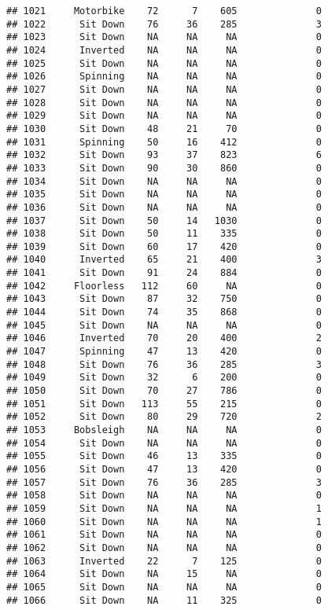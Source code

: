 \documentclass[
]{article}
\begin{document}
\begin{verbatim}
## 1021     Motorbike    72      7    605              0
## 1022      Sit Down    76     36    285              3
## 1023      Sit Down    NA     NA     NA              0
## 1024      Inverted    NA     NA     NA              0
## 1025      Sit Down    NA     NA     NA              0
## 1026      Spinning    NA     NA     NA              0
## 1027      Sit Down    NA     NA     NA              0
## 1028      Sit Down    NA     NA     NA              0
## 1029      Sit Down    NA     NA     NA              0
## 1030      Sit Down    48     21     70              0
## 1031      Spinning    50     16    412              0
## 1032      Sit Down    93     37    823              6
## 1033      Sit Down    90     30    860              0
## 1034      Sit Down    NA     NA     NA              0
## 1035      Sit Down    NA     NA     NA              0
## 1036      Sit Down    NA     NA     NA              0
## 1037      Sit Down    50     14   1030              0
## 1038      Sit Down    50     11    335              0
## 1039      Sit Down    60     17    420              0
## 1040      Inverted    65     21    400              3
## 1041      Sit Down    91     24    884              0
## 1042     Floorless   112     60     NA              0
## 1043      Sit Down    87     32    750              0
## 1044      Sit Down    74     35    868              0
## 1045      Sit Down    NA     NA     NA              0
## 1046      Inverted    70     20    400              2
## 1047      Spinning    47     13    420              0
## 1048      Sit Down    76     36    285              3
## 1049      Sit Down    32      6    200              0
## 1050      Sit Down    70     27    786              0
## 1051      Sit Down   113     55    215              0
## 1052      Sit Down    80     29    720              2
## 1053     Bobsleigh    NA     NA     NA              0
## 1054      Sit Down    NA     NA     NA              0
## 1055      Sit Down    46     13    335              0
## 1056      Sit Down    47     13    420              0
## 1057      Sit Down    76     36    285              3
## 1058      Sit Down    NA     NA     NA              0
## 1059      Sit Down    NA     NA     NA              1
## 1060      Sit Down    NA     NA     NA              1
## 1061      Sit Down    NA     NA     NA              0
## 1062      Sit Down    NA     NA     NA              0
## 1063      Inverted    22      7    125              0
## 1064      Sit Down    NA     15     NA              0
## 1065      Sit Down    NA     NA     NA              0
## 1066      Sit Down    NA     11    325              0

\end{verbatim}
\end{document}
